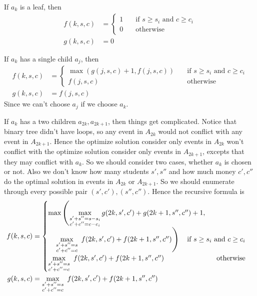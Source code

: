 \documentclass[12pt, a4paper]{article}
\begin{document}
\begin{enumerate}
    If $a_k$ is a leaf, then 
    \begin{align*}
      f(k, s, c) &= 
      \begin{cases}
        1 & \quad \text{if } s \geq s_i \text{ and } c \geq c_i \\
        0 & \quad \text{otherwise}
      \end{cases} \\
      g(k, s, c) &= 0
    \end{align*}

    If $a_k$ has a single child $a_j$, then
    \begin{align*}
      f(k, s, c) &= 
      \begin{cases}
        \max\left( g(j, s, c) + 1, f(j, s, c) \right) & \quad \text{if } s \geq s_i \text{ and } c \geq c_i \\
        f(j, s, c) & \quad \text{otherwise}
      \end{cases} \\
      g(k, s, c) &= f(j, s, c)
    \end{align*}
    Since we can't choose $a_j$ if we choose $a_k$.

    If $a_k$ has a two children $a_{2k}, a_{2k+1}$, then things get complicated. Notice that 
    binary tree didn't have loops, so any event in $A_{2k}$ would not conflict with any event in $A_{2k+1}$.
    Hence the optimize solution consider only events in $A_{2k}$ won't conflict with the 
    optimize solution consider only events in $A_{2k+1}$, excepts that they may conflict with $a_k$.
    So we should consider two cases, whether $a_k$ is chosen or not. Also we don't know how many students 
    $s', s''$ and how much money $c', c''$ do the optimal solution in events in $A_{2k}$ or $A_{2k+1}$.
    So we should enumerate through every possible pair $(s', c'), (s'', c'')$. Hence the recursive formula is
    \begin{align*}
      f(k, s, c) &= 
      \begin{cases}
        \max\left(\max\limits_{\substack{s'+s'' = s-s_i \\ c'+c'' = c-c_i}} 
          g(2k, s', c') + g(2k+1, s'', c'') + 1,\right.  \\ 
        \quad \left.\max\limits_{\substack{s'+s'' = s \\ c'+c'' = c}} 
          \ f(2k, s', c') + f(2k+1, s'', c'') \right) \quad \hfill \text{if } s \geq s_i \text{ and } c \geq c_i \\
        \max\limits_{\substack{s'+s'' = s \\ c'+c'' = c}} 
          \ f(2k, s', c') + f(2k+1, s'', c'') \hfill \text{otherwise}
      \end{cases} \\
      g(k, s, c) &= \max\limits_{\substack{s'+s'' = s \\ c'+c'' = c}} 
          \ f(2k, s', c') + f(2k+1, s'', c'')
    \end{align*}


\end{enumerate}
\end{document}
